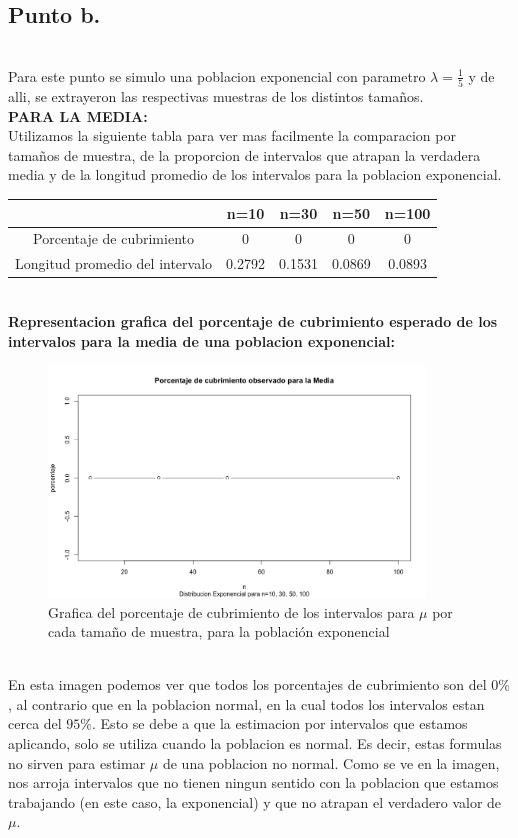 \documentclass[letterpaper,12pt,onecolumn,titlepage]{article}
\begin{document}
\pagebreak\subsection{Punto b.}
~\\ Para este punto se simulo una poblacion exponencial con parametro $\lambda=\frac{1}{5}$ y de alli, se extrayeron las respectivas muestras de los distintos tama\~{n}os.
~\\ \textbf{PARA LA MEDIA:}
~\\ Utilizamos la siguiente tabla para ver mas facilmente la comparacion por tama\~{n}os de muestra, de la proporcion de intervalos que atrapan la verdadera media y de la longitud promedio de los intervalos para la poblacion exponencial.
\begin{center}
\begin{tabular}{|c|c|c|c|c|}
\hline 
\rule[-1ex]{0pt}{2.5ex}  & n=10 & n=30 & n=50 & n=100 \\ 
\hline 
\rule[-1ex]{0pt}{2.5ex} Porcentaje de cubrimiento & 0 & 0 & 0 & 0 \\ 
\hline 
\rule[-1ex]{0pt}{2.5ex} Longitud promedio del intervalo & 0.2792 & 0.1531 & 0.0869 & 0.0893 \\ 
\hline 
\end{tabular} 
\end{center}
~\\\textbf{Representacion grafica del porcentaje de cubrimiento esperado de los intervalos para la media de una poblacion exponencial:}
~\\ \begin{figure}[!h]
    \begin{center}
        \includegraphics[width=10cm]{Figuras/Pc1.png}
        \caption{Grafica del porcentaje de cubrimiento de los intervalos para $\mu$ por cada tama\~{n}o de muestra, para la poblaci\'{o}n exponencial}
        \label{fig:Densidad}
    \end{center}
\end{figure}
~\\ En esta imagen podemos ver que todos los porcentajes de cubrimiento son del $0\%$, al contrario que en la poblacion normal, en la cual todos los intervalos estan cerca del $95\%$. Esto se debe a que la estimacion por intervalos que estamos aplicando, solo se utiliza cuando la poblacion es normal. Es decir, estas formulas no sirven para estimar $\mu$ de una poblacion no normal. Como se ve en la imagen, nos arroja intervalos que no tienen ningun sentido con la poblacion que estamos trabajando (en este caso, la exponencial) y que no atrapan el verdadero valor de $\mu$.
\end{document}
